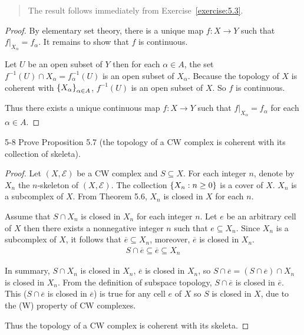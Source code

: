 \begin{quote}
	The result follows immediately from Exercise~\ref{exercise:5.3}.
\end{quote}

\begin{proof}
	By elementary set theory, there is a unique map \( f: X \to Y \) such that \( f\vert_{X_{\alpha}} = f_{\alpha} \). It remains to show that \( f \) is continuous.

	Let \( U \) be an open subset of \( Y \) then for each \( \alpha\in A \), the set \( f^{-1}(U) \cap X_{\alpha} = f_{\alpha}^{-1}(U) \) is an open subset of \( X_{\alpha} \). Because the topology of \( X \) is coherent with \( \left\{{X_{\alpha}}\right\}_{\alpha\in A} \), \( f^{-1}(U) \) is an open subset of \( X \). So \( f \) is continuous.

	Thus there exists a unique continuous map \( f: X\to Y \) such that \( f\vert_{X_{\alpha}} = f_{\alpha} \) for each \( \alpha\in A \).
\end{proof}

\begin{problem}{5-8}\label{problem:5-8}
Prove Proposition 5.7 (the topology of a CW complex is coherent with its
collection of skeleta).
\end{problem}

\begin{proof}
	Let \( (X, \mathscr{E}) \) be a CW complex and \( S \subseteq X \). For each integer \( n \), denote by \( X_{n} \) the \( n \)-skeleton of \( (X, \mathscr{E}) \). The collection \( \left\{{ X_{n} : n\geq 0 }\right\} \) is a cover of \( X \). \( X_{n} \) is a subcomplex of \( X \). From Theorem 5.6, \( X_{n} \) is closed in \( X \) for each \( n \).

	Assume that \( S \cap X_{n} \) is closed in \( X_{n} \) for each integer \( n \). Let \( e \) be an arbitrary cell of \( X \) then there exists a nonnegative integer \( n \) such that \( e \subseteq X_{n} \). Since \( X_{n} \) is a subcomplex of \( X \), it follows that \( \overline{e} \subseteq X_{n} \), moreover, \( \overline{e} \) is closed in \( X_{n} \).
	\begin{align*}
		S \cap \overline{e} \subseteq \overline{e} \subseteq X_{n}
	\end{align*}

	In summary, \( S\cap X_{n} \) is closed in \( X_{n} \), \( \overline{e} \) is closed in \( X_{n} \), so \( S\cap \overline{e} = (S\cap \overline{e}) \cap X_{n} \) is closed in \( X_{n} \). From the definition of subspace topology, \( S \cap \overline{e} \) is closed in \( \overline{e} \). This (\( S\cap \overline{e} \) is closed in \( \overline{e} \)) is true for any cell \( e \) of \( X \) so \( S \) is closed in \( X \), due to the (W) property of CW complexes.

	Thus the topology of a CW complex is coherent with its skeleta.
\end{proof}

